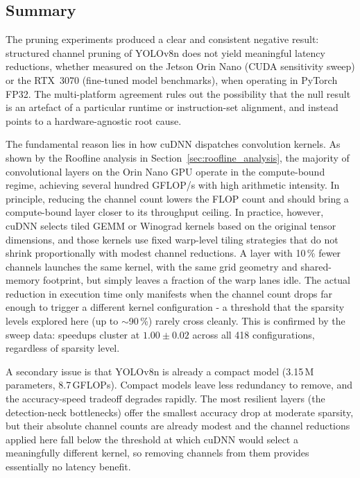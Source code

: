 \documentclass[12pt,a4paper]{report}
\begin{document}
\subsection{Summary}

The pruning experiments produced a clear and consistent negative result: structured
channel pruning of YOLOv8n does not yield meaningful latency reductions, whether measured
on the Jetson Orin Nano (CUDA sensitivity sweep) or the RTX~3070 (fine-tuned model
benchmarks), when operating in PyTorch FP32. The multi-platform agreement rules out the
possibility that the null result is an artefact of a particular runtime or instruction-set
alignment, and instead points to a hardware-agnostic root cause.

The fundamental reason lies in how cuDNN dispatches convolution kernels. As shown by the
Roofline analysis in Section~\ref{sec:roofline_analysis}, the majority of convolutional
layers on the Orin Nano GPU operate in the compute-bound regime, achieving several hundred
GFLOP/s with high arithmetic intensity. In principle, reducing the channel count lowers
the FLOP count and should bring a compute-bound layer closer to its throughput ceiling.
In practice, however, cuDNN selects tiled GEMM or Winograd kernels based on the original
tensor dimensions, and those kernels use fixed warp-level tiling strategies that do not
shrink proportionally with modest channel reductions. A layer with 10\,\% fewer channels
launches the same kernel, with the same grid geometry and shared-memory footprint, but
simply leaves a fraction of the warp lanes idle. The actual reduction in execution time
only manifests when the channel count drops far enough to trigger a different kernel
configuration - a threshold that the sparsity levels explored here (up to $\sim$90\,\%)
rarely cross cleanly. This is confirmed by the sweep data: speedups cluster at
$1.00\pm0.02$ across all 418 configurations, regardless of sparsity level.

A secondary issue is that YOLOv8n is already a compact model (3.15\,M parameters,
8.7\,GFLOPs). Compact models leave less redundancy to remove, and the accuracy-speed
tradeoff degrades rapidly. The most resilient layers (the detection-neck bottlenecks)
offer the smallest accuracy drop at moderate sparsity, but their absolute channel counts
are already modest and the channel reductions applied here fall below the threshold at
which cuDNN would select a meaningfully different kernel, so removing channels from them
provides essentially no latency benefit.
\end{document}
